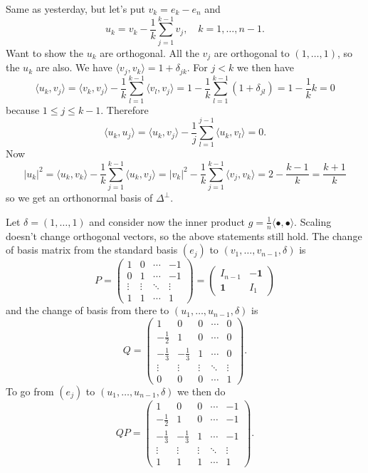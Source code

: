 \documentclass[11pt]{amsart}
\theoremstyle{definition}
\def\<{\langle}
\def\>{\rangle}
\begin{document}
Same as yesterday, but let's put $v_k = e_k - e_n$ and
\[
u_k = v_k - \frac1k \sum_{j=1}^{k-1} v_j,
\quad
k = 1,\ldots,n-1.
\]
Want to show the $u_k$ are orthogonal.
All the $v_j$ are orthogonal to $(1,\ldots,1)$, so the $u_k$ are also.
We have $\<v_j, v_k \> = 1 + \delta_{jk}$.
For $j < k$ we then have
\[
\<u_k, v_j \>
= \<v_k, v_j \> - \frac1k \sum_{l=1}^{k-1} \<v_l, v_j\>
= 1 - \frac1k \sum_{l=1}^{k-1} ( 1 + \delta_{jl} )
= 1 - \frac1k k
= 0
\]
because $1 \leq j \leq k-1$.
Therefore
\[
\<u_k, u_j \>
= \<u_k, v_j \> - \frac1j \sum_{l=1}^{j-1} \<u_k, v_l\>
= 0.
\]
Now
\[
|u_k|^2
= \<u_k, v_k \> - \frac1k \sum_{j=1}^{k-1} \<u_k, v_j\>
= |v_k|^2 - \frac1k \sum_{j=1}^{k-1} \<v_j, v_k\>
= 2 - \frac{k-1}{k}
= \frac{k + 1}{k}
\]
so we get an orthonormal basis of $\Delta^\perp$.

Let $\delta = (1,\ldots,1)$ and consider now the inner product $g = \frac1n \<\bullet, \bullet\>$.
Scaling doesn't change orthogonal vectors, so the above statements still hold.
The change of basis matrix from the standard basis $(e_j)$ to $(v_1, \ldots, v_{n-1}, \delta)$ is
\[
P = \begin{pmatrix}
1 & 0 & \cdots & -1
\\
0 & 1 & \cdots & -1
\\
\vdots & \vdots & \ddots & \vdots
\\
1 & 1 & \cdots & 1
\end{pmatrix}
=
\begin{pmatrix}
I_{n-1} & - \mathbf{1}
\\
\mathbf{1} & I_1
\end{pmatrix}
\]
and the change of basis from there to $(u_1, \ldots, u_{n-1}, \delta)$ is
\[
Q = \begin{pmatrix}
1 & 0 & 0 & \cdots & 0
\\
-\frac12 & 1 & 0 & \cdots & 0
\\
-\frac13 & -\frac13 & 1 & \cdots & 0
\\
\vdots & \vdots & \vdots & \ddots & \vdots
\\
0 & 0 & 0 & \cdots & 1
\end{pmatrix}.
\]
To go from $(e_j)$ to $(u_1,\ldots,u_{n-1},\delta)$ we then do
\[
QP = \begin{pmatrix}
1 & 0 & 0 & \cdots & -1
\\
-\frac12 & 1 & 0 & \cdots & -1
\\
-\frac13 & -\frac13 & 1 & \cdots & -1
\\
\vdots & \vdots & \vdots & \ddots & \vdots
\\
1 & 1 & 1 & \cdots & 1
\end{pmatrix}.
\]
\end{document}
